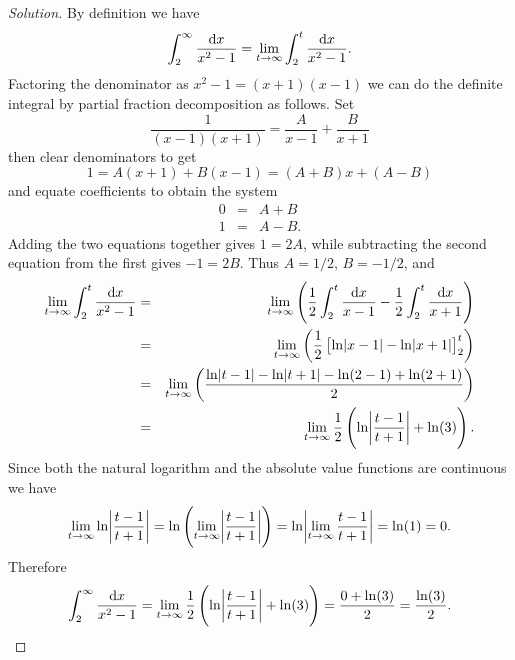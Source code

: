 \documentclass[12pt]{amsart}
\begin{document}
\begin{proof}[Solution]
  By definition we have
  \[\int_2^\infty \frac{\dif x}{x^2 - 1} = \lim_{t \to \infty} \int_2^t \frac{\dif x}{x^2 - 1}.\]
  Factoring the denominator as \(x^2 - 1 = (x + 1)(x - 1)\) we can do the definite integral by partial fraction decomposition as follows.
  Set
  \[\frac{1}{(x - 1)(x + 1)} = \frac{A}{x - 1} + \frac{B}{x + 1}\]
  then clear denominators to get
  \[1 = A(x + 1) + B(x - 1) = (A + B)x + (A - B)\]
  and equate coefficients to obtain the system
  \begin{eqnarray*}
    0 &=& A + B\\
    1 &=& A - B.
  \end{eqnarray*}
  Adding the two equations together gives \(1 = 2A\), while subtracting the second equation from the first gives \(-1 = 2B\).
  Thus \(A = 1/2\), \(B = -1/2\), and
  \begin{eqnarray*}
    \lim_{t \to \infty} \int_2^t \frac{\dif x}{x^2 - 1} &=& \lim_{t \to \infty}\left(\frac{1}{2}\int_2^t \frac{\dif x}{x - 1} - \frac{1}{2} \int_2^t \frac{\dif x}{x + 1}\right)\\
    &=& \lim_{t \to \infty} \left(\frac{1}{2}\left[\ln \abs{x - 1} - \ln\abs{x+1}\right]_2^t\right)\\
    &=& \lim_{t \to \infty} \left(\frac{\ln \abs{t - 1} - \ln\abs{t + 1} - \ln(2 - 1) + \ln(2 + 1)}{2}\right)\\
    &=& \lim_{t \to \infty} \frac{1}{2}\left(\ln\abs{\frac{t - 1}{t + 1}} + \ln(3)\right).
  \end{eqnarray*}
  Since both the natural logarithm and the absolute value functions are continuous we have 
  \[\lim_{t \to \infty} \ln\abs{\frac{t - 1}{t + 1}} = \ln\left(\lim_{t \to \infty} \abs{\frac{t -  1}{t + 1}}\right) = \ln\abs{\lim_{t\to\infty} \frac{t -1}{t + 1}} = \ln(1) = 0.\]
  Therefore
  \[\int_2^\infty \frac{\dif x}{x^2 - 1} =  \lim_{t \to \infty} \frac{1}{2}\left(\ln\abs{\frac{t - 1}{t + 1}} + \ln(3)\right) = \frac{0 + \ln(3)}{2} = \frac{\ln(3)}{2}.\]
\end{proof}
\end{document}
